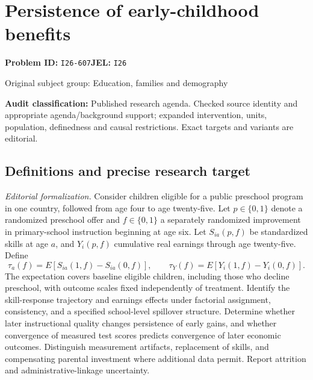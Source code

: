 \documentclass[11pt,a4paper]{article}
\begin{document}
\section*{Persistence of early-childhood benefits}
\textbf{Problem ID:} \texttt{I26-607}\quad \textbf{JEL:} \texttt{I26}\par
\label{problem:OP-0450}
{\sffamily\small\color{muted}Original subject group: Education, families and demography\par}
\label{definitions:problem:30007732}
\textbf{Audit classification:} Published research agenda. Checked source identity and appropriate agenda/background support; expanded intervention, units, population, definedness and causal restrictions. Exact targets and variants are editorial.
\subsection*{Definitions and precise research target}
\textit{Editorial formalization.} Consider children eligible for a public preschool program in one country, followed from age four to age twenty-five. Let \(p\in\{0,1\}\) denote a randomized preschool offer and \(f\in\{0,1\}\) a separately randomized improvement in primary-school instruction beginning at age six. Let \(S_{ia}(p,f)\) be standardized skills at age \(a\), and \(Y_i(p,f)\) cumulative real earnings through age twenty-five. Define
\[\tau_a(f)=E[S_{ia}(1,f)-S_{ia}(0,f)],\qquad\tau_Y(f)=E[Y_i(1,f)-Y_i(0,f)].\]
The expectation covers baseline eligible children, including those who decline preschool, with outcome scales fixed independently of treatment. Identify the skill-response trajectory and earnings effects under factorial assignment, consistency, and a specified school-level spillover structure. Determine whether later instructional quality changes persistence of early gains, and whether convergence of measured test scores predicts convergence of later economic outcomes. Distinguish measurement artifacts, replacement of skills, and compensating parental investment where additional data permit. Report attrition and administrative-linkage uncertainty.
\end{document}
